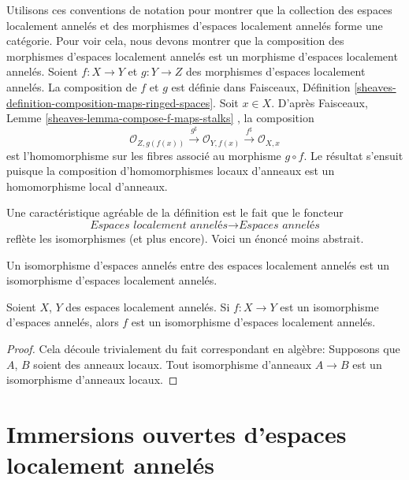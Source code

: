 \medskip\noindent
Utilisons ces conventions de notation pour montrer que la collection des espaces
localement annelés et des morphismes d'espaces localement annelés forme une
catégorie. Pour voir cela, nous devons montrer que la composition des morphismes
d'espaces localement annelés est un morphisme d'espaces localement annelés.
Soient  $f : X \to Y$  et  $g : Y \to Z$  des morphismes d'espaces localement
annelés. La composition de  $f$  et  $g$  est définie dans
Faisceaux, Définition  \ref{sheaves-definition-composition-maps-ringed-spaces}. Soit  $x \in X$. D'après Faisceaux, Lemme
 \ref{sheaves-lemma-compose-f-maps-stalks} , la composition
$$
\mathcal{O}_{Z, g(f(x))}
\xrightarrow{g^\sharp}
\mathcal{O}_{Y, f(x)}
\xrightarrow{f^\sharp}
\mathcal{O}_{X, x}
$$
est l'homomorphisme sur les fibres associé au morphisme  $g \circ f$. Le résultat
s'ensuit puisque la composition d'homomorphismes locaux d'anneaux est un
homomorphisme local d'anneaux.

\medskip\noindent
Une caractéristique agréable de la définition est le fait que le foncteur
$$
\textit{Espaces localement annelés}
\longrightarrow
\textit{Espaces annelés}
$$
reflète les isomorphismes (et plus encore). Voici un énoncé moins abstrait.

\begin{lemma}
\label{lemma-isomorphism-locally-ringed}
\begin{slogan}
Un isomorphisme d'espaces annelés entre des espaces localement annelés est un
isomorphisme d'espaces localement annelés.
\end{slogan}
Soient  $X$,  $Y$  des espaces localement annelés. Si  $f : X \to Y$ 
est un isomorphisme d'espaces annelés, alors  $f$  est un isomorphisme
d'espaces localement annelés.
\end{lemma}

\begin{proof}
Cela découle trivialement du fait correspondant en algèbre: Supposons que
 $A$,  $B$  soient des anneaux locaux. Tout isomorphisme d'anneaux
 $A \to B$  est un isomorphisme d'anneaux locaux.
\end{proof}













\section{Immersions ouvertes d'espaces localement annelés}
\label{section-open-immersion}

